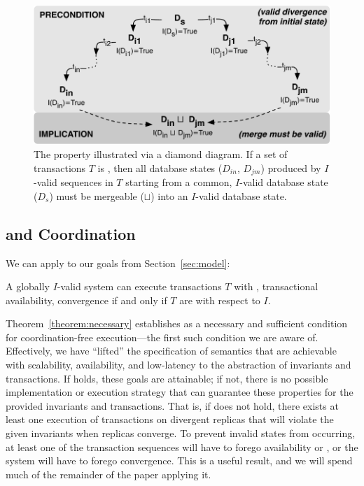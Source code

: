 \begin{figure}
\begin{center}
\includegraphics[width=\columnwidth]{figs/icommute.pdf}\vspace{-1em}
\end{center}
\caption{The \iconfluence property illustrated via a diamond
  diagram. If a set of transactions $T$ is \iconfluent, then all
  database states ($D_{in}$, $D_{jm}$) produced by $I$-valid sequences
  in $T$ starting from a common, $I$-valid database state ($D_s$) must
  be mergeable ($\sqcup$) into an $I$-valid database state.}
\label{fig:iconfluence}
\end{figure}

\subsection{\iconfluence and Coordination}

We can apply \iconfluence to our goals from Section~\ref{sec:model}:

\begin{theorem}
\label{theorem:necessary}
A globally $I$-valid system can execute transactions $T$ with
\cfreedom, transactional availability, convergence if and only if $T$
are \iconfluent with respect to $I$.
\end{theorem}

Theorem~\ref{theorem:necessary} establishes \iconfluence as a
necessary and sufficient condition for coordination-free
execution---the first such condition we are aware of. Effectively, we
have ``lifted'' the specification of semantics that are achievable
with scalability, availability, and low-latency to the abstraction of
invariants and transactions. If \iconfluence holds, these goals are
attainable; if not, there is no possible implementation or execution
strategy that can guarantee these properties for the provided
invariants and transactions. That is, if \iconfluence does not hold,
there exists at least one execution of transactions on divergent
replicas that will violate the given invariants when replicas
converge. To prevent invalid states from occurring, at least one of the
transaction sequences will have to forego availability or \cfreedom,
or the system will have to forego convergence. This is a useful
result, and we will spend much of the remainder of the paper applying
it.

